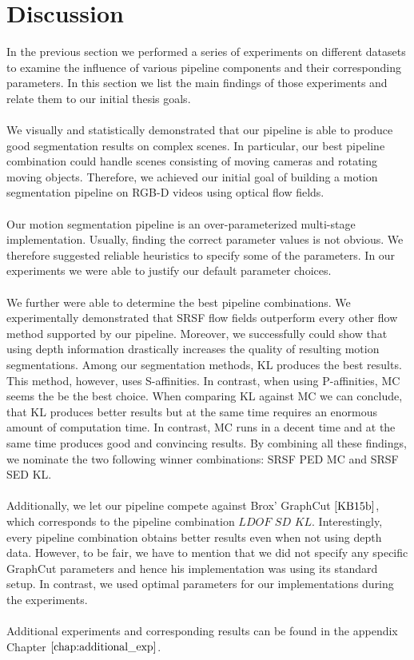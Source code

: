 \section{Discussion}
\label{sec:discussion}
In the previous section we performed a series of experiments on different datasets to examine the influence of various pipeline components and their corresponding parameters. In this section we list the main findings of those experiments and relate them to our initial thesis goals. \\ \\
We visually and statistically demonstrated that our pipeline is able to produce good segmentation results on complex scenes. In particular, our best pipeline combination could handle scenes consisting of moving cameras and rotating moving objects. Therefore, we achieved our initial goal of building a motion segmentation pipeline on RGB-D videos using optical flow fields. \\ \\
Our motion segmentation pipeline is an over-parameterized multi-stage implementation. Usually, finding the correct parameter values is not obvious. We therefore suggested reliable heuristics to specify some of the parameters. In our experiments we were able to justify our default parameter choices. \\ \\
We further were able to determine the best pipeline combinations. We experimentally demonstrated that SRSF flow fields outperform every other flow method supported by our pipeline. Moreover, we successfully could show that using depth information drastically increases the quality of resulting motion segmentations. Among our segmentation methods, KL produces the best results. This method, however, uses S-affinities. In contrast, when using P-affinities, MC seems the be the best choice. When comparing KL against MC we can conclude, that KL produces better results but at the same time requires an enormous amount of computation time. In contrast, MC runs in a decent time and at the same time produces good and convincing results. By combining all these findings, we nominate the two following winner combinations: SRSF PED MC and SRSF SED KL. \\ \\
Additionally, we let our pipeline compete against Brox' GraphCut $\cite{KB15b}$, which corresponds to the pipeline combination $\textit{LDOF SD KL}$. Interestingly, every pipeline combination obtains better results even when not using depth data. However, to be fair, we have to mention that we did not specify any specific GraphCut parameters and hence his implementation was using its standard setup. In contrast, we used optimal parameters for our implementations during the experiments. \\ \\
Additional experiments and corresponding results can be found in the appendix Chapter $\ref{chap:additional_exp}$.
